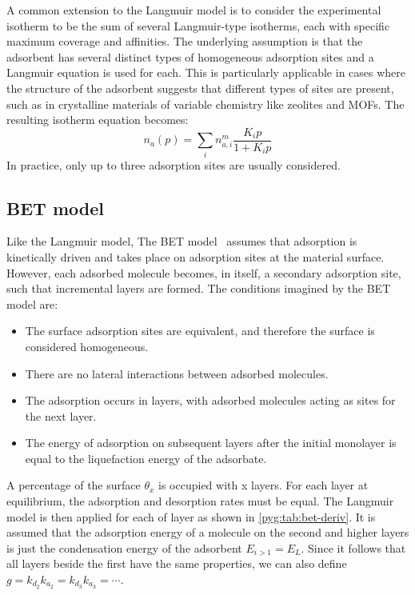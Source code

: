 A common extension to the Langmuir model is to consider
the experimental isotherm to be the sum of several Langmuir-type
isotherms, each with specific maximum coverage and affinities.
The underlying assumption is that the adsorbent has several distinct
types of homogeneous adsorption sites and a Langmuir
equation is used for each. This is particularly
applicable in cases where the structure of the adsorbent
suggests that different types of sites are present,
such as in crystalline materials of variable chemistry like
zeolites and MOFs. The resulting isotherm equation becomes:
%
\begin{equation}\label{pyg:eqn:langmulti}
	n_a(p) = \sum_i n_{a,i}^m\frac{K_i p}{1+K_i p}
\end{equation}
%
In practice, only up to three adsorption sites are usually
considered.

\subsection{BET model}\label{pyg:models:bet}

Like the Langmuir model, The BET model~\cite{brunauerAdsorptionGasesMultimolecular1938}
assumes that adsorption is kinetically driven and takes place on adsorption
sites at the material surface. However, each adsorbed molecule becomes,
in itself, a secondary adsorption site, such that incremental layers
are formed. The conditions imagined by the BET model are:

\begin{itemize}
	\item The surface adsorption sites are equivalent, and therefore the
	      surface is considered homogeneous.
	\item There are no lateral interactions between adsorbed
	      molecules.
	\item The adsorption occurs in layers, with adsorbed
	      molecules acting as sites for the next layer.
	\item The energy of adsorption on subsequent layers after 
		  the initial monolayer is equal to the liquefaction energy
		  of the adsorbate.
\end{itemize}

A percentage of the surface \(\theta_x\) is occupied with
x layers. For each layer at equilibrium, the adsorption and
desorption rates must be equal.
The Langmuir model is then applied for each of layer
as shown in \autoref{pyg:tab:bet-deriv}. It is assumed
that the adsorption energy of a molecule on the second
and higher layers is just the condensation energy of the
adsorbent \(E_{i>1} = E_L\). Since it follows that
all layers beside the first have the same properties,
we can also define \(g= {k_{d_2}}{k_{a_2}} = {k_{d_3}}{k_{a_3}} =
\cdots \).

